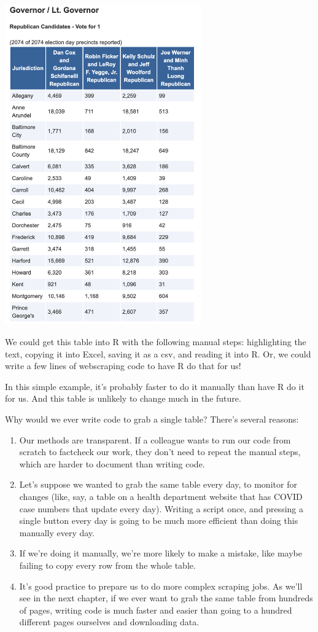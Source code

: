 \documentclass[
  letterpaper,
  DIV=11,
  numbers=noendperiod]{scrreprt}
\providecommand{\tightlist}{%
  \setlength{\itemsep}{0pt}\setlength{\parskip}{0pt}}\usepackage{longtable,booktabs,array}
\begin{document}
\includegraphics[width=3.33in,height=\textheight]{./images/rvest1.png}

We could get this table into R with the following manual steps:
highlighting the text, copying it into Excel, saving it as a csv, and
reading it into R. Or, we could write a few lines of webscraping code to
have R do that for us!

In this simple example, it's probably faster to do it manually than have
R do it for us. And this table is unlikely to change much in the future.

Why would we ever write code to grab a single table? There's several
reasons:

\begin{enumerate}
\def\labelenumi{\arabic{enumi}.}
\tightlist
\item
  Our methods are transparent. If a colleague wants to run our code from
  scratch to factcheck our work, they don't need to repeat the manual
  steps, which are harder to document than writing code.
\item
  Let's suppose we wanted to grab the same table every day, to monitor
  for changes (like, say, a table on a health department website that
  has COVID case numbers that update every day). Writing a script once,
  and pressing a single button every day is going to be much more
  efficient than doing this manually every day.
\item
  If we're doing it manually, we're more likely to make a mistake, like
  maybe failing to copy every row from the whole table.
\item
  It's good practice to prepare us to do more complex scraping jobs. As
  we'll see in the next chapter, if we ever want to grab the same table
  from hundreds of pages, writing code is much faster and easier than
  going to a hundred different pages ourselves and downloading data.
\end{enumerate}
\end{document}
